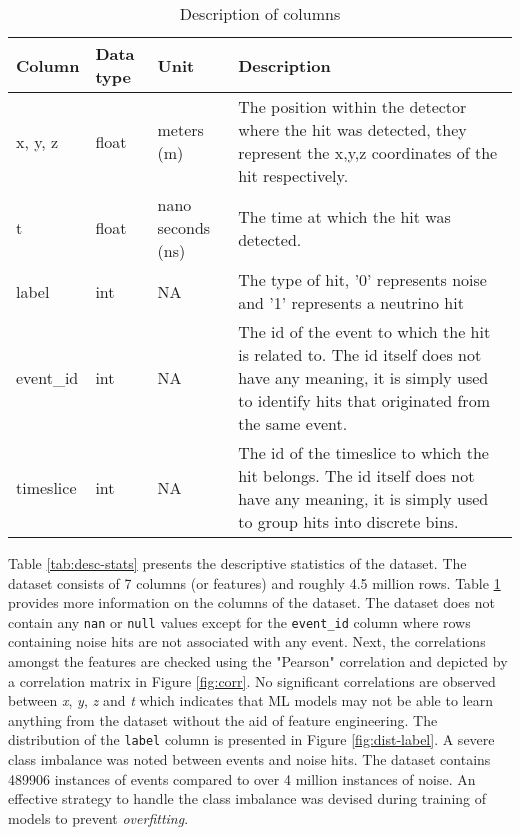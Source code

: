 \begin{table}[h]
  \centering
  \caption{Description of columns}
  \label{tab:desc-cols}
  \begin{tabular}{p{1.5cm}p{1.5cm}p{2cm}p{8cm}}
    \hline
    Column & Data type & Unit & Description \\
    \hline
    x, y, z & float & meters (m) & The position within the detector
    where the hit was detected, they represent the x,y,z coordinates
    of the hit respectively. \\
    t & float & nano seconds (ns) & The time at which the hit was
    detected. \\
    label & int & NA & The type of hit, '0' represents noise and '1'
    represents a neutrino hit \\
    event\_id & int & NA & The id of the event to which the hit is
    related to. The id itself does not have any meaning, it is simply
    used to identify hits that originated from the same event. \\
    timeslice & int & NA & The id of the timeslice to which the hit
    belongs. The id itself does not have any meaning, it is simply
    used to group hits into discrete bins. \\
    \hline
  \end{tabular}
\end{table}

Table \ref{tab:desc-stats} presents the descriptive statistics of the
dataset. The dataset consists of 7 columns (or features) and roughly
4.5 million rows. Table \ref{tab:desc-cols} provides more information
on the columns of the dataset. The dataset does not contain any
\texttt{nan} or \texttt{null} values except for the \texttt{event\_id}
column where rows containing noise hits are not associated with any
event. Next, the correlations amongst the features are checked using
the "Pearson" correlation and depicted by a correlation matrix in
Figure \ref{fig:corr}. No significant correlations are observed
between \emph{x}, \emph{y}, \emph{z} and \emph{t} which indicates that
ML models may not be able to learn anything from the dataset without
the aid of feature engineering. The distribution of the \texttt{label}
column is presented in Figure \ref{fig:dist-label}. A severe class
imbalance was noted between events and noise hits. The dataset
contains 489906 instances of events compared to over 4 million
instances of noise. An effective strategy to handle the class
imbalance was devised during training of models to prevent
\emph{overfitting}.


